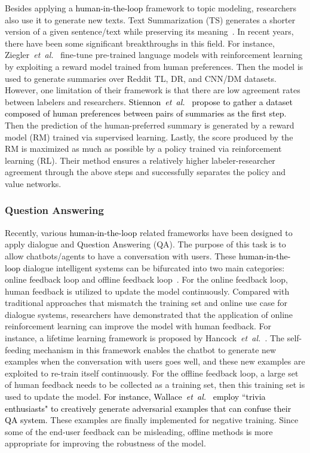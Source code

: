 \documentclass{article}
\newcommand\etal{\emph{et~al.}}
\newcommand{\REO}[1]{\textcolor{black}{#1}}
\newcommand{\ZJH}[1]{\textcolor{black}{#1}}
\begin{document}
Besides applying a \REO{human-in-the-loop} framework to topic modeling, researchers also use \ZJH{it} to generate new texts. Text Summarization (TS) generates a shorter version of a given sentence/text while preserving its meaning~\cite{chopra2016abstractive}.
In recent years, there have been some significant breakthroughs in this field. For instance, Ziegler~\etal~\cite{ziegler2019fine} fine-tune pre-trained language models with reinforcement learning by exploiting a reward model trained from human preferences. Then the model is used to generate summaries over Reddit TL, DR, and CNN/DM datasets. However, one limitation of their framework is that there are low agreement rates between labelers and researchers.
\ZJH{Stiennon~\etal~\cite{stiennon2020learning} propose to gather a dataset composed of human preferences between pairs of summaries as the first step}. Then the prediction of the human-preferred summary is generated by a reward model (RM) trained via supervised learning. Lastly, the score produced by the RM is maximized as much as possible by a policy trained via reinforcement learning (RL). Their method ensures a relatively higher labeler-researcher agreement through the above steps and successfully separates the policy and value networks.


\subsubsection{Question Answering}

Recently, various \REO{human-in-the-loop} related frameworks have been designed to apply dialogue and Question Answering (QA). The purpose of this task is to allow chatbots/agents to have a conversation with users. These \REO{human-in-the-loop} dialogue intelligent systems can be bifurcated into two main categories: online feedback loop and offline feedback loop~\cite{wang2021putting}. For the online feedback loop, human feedback is utilized to update the model continuously. Compared with traditional approaches that mismatch the training set and online use case for dialogue systems, researchers have demonstrated that the application of online reinforcement learning can improve the model with human feedback. For instance, a lifetime learning framework is proposed by Hancock~\etal~\cite{hancock2019learning}. The self-feeding mechanism in this framework enables the chatbot to generate new examples when the conversation with users goes well, and these new examples are exploited to re-train itself continuously. For the offline feedback loop, a large set of human feedback needs to be collected as a training set, then this training set is used to update the model. \ZJH{For instance, Wallace~\etal~\cite{wallace2019trick} employ ``trivia enthusiasts" to creatively generate adversarial examples that can confuse their QA system.} These examples are finally implemented for negative training. Since some of the end-user feedback can be misleading, offline methods \ZJH{is} more appropriate for improving the robustness of the model.
\end{document}
